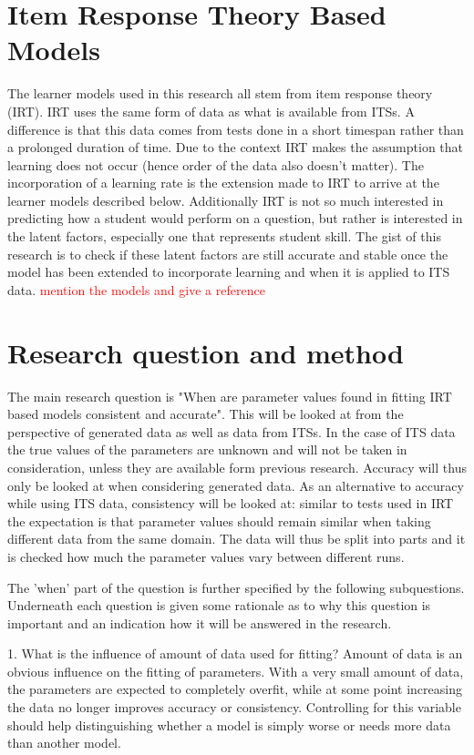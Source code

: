 \documentclass{scrartcl}
\newcommand\todo[1]{\textcolor{red}{#1}}
\begin{document}
 \section{Item Response Theory Based Models}
 The learner models used in this research all stem from item response theory (IRT). IRT uses the same form of data as what is available from ITSs. A difference is that this data comes from tests done in a short timespan rather than a prolonged duration of time. Due to the context IRT makes the assumption that learning does not occur (hence order of the data also doesn't matter). The incorporation of a learning rate is the extension made to IRT to arrive at the learner models described below. Additionally IRT is not so much interested in predicting how a student would perform on a question, but rather is interested in the latent factors, especially one that represents student skill. The gist of this research is to check if these latent factors are still accurate and stable once the model has been extended to incorporate learning and when it is applied to ITS data.
\todo{mention the models and give a reference}

\section{Research question and method}
The main research question is "When are parameter values found in fitting IRT based models consistent and accurate". This will be looked at from the perspective of generated data as well as data from ITSs. In the case of ITS data the true values of the parameters are unknown and will not be taken in consideration, unless they are available form previous research. Accuracy will thus only be looked at when considering generated data. As an alternative to accuracy while using ITS data, consistency will be looked at: similar to tests used in IRT the expectation is that parameter values should remain similar when taking different data from the same domain. The data will thus be split into parts and it is checked how much the parameter values vary between different runs.

The 'when' part of the question is further specified by the following subquestions. Underneath each question is given some rationale as to why this question is important and an indication how it will be answered in the research.

1. What is the influence of amount of data used for fitting? Amount of data is an obvious influence on the fitting of parameters. With a very small amount of data, the parameters are expected to completely overfit, while at some point increasing the data no longer improves accuracy or consistency. Controlling for this variable should help distinguishing whether a model is simply worse or needs more data than another model. 
\end{document}
